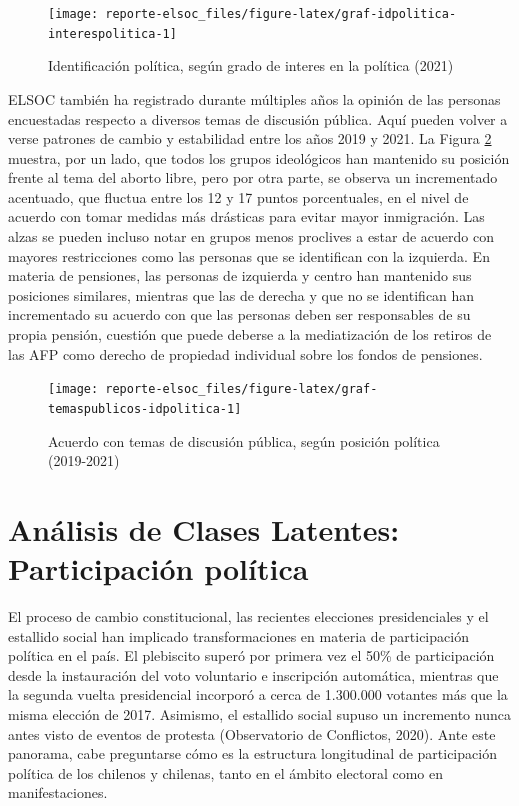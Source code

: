 \documentclass[
  12pt,
]{book}
\begin{document}
\begin{figure}

{\centering \texttt{[image: reporte-elsoc\_files/figure-latex/graf-idpolitica-interespolitica-1]} 

}

\caption{Identificación política, según grado de interes en la política (2021)}\label{fig:graf-idpolitica-interespolitica}
\end{figure}

ELSOC también ha registrado durante múltiples años la opinión de las personas encuestadas respecto a diversos temas de discusión pública. Aquí pueden volver a verse patrones de cambio y estabilidad entre los años 2019 y 2021. La Figura \ref{fig:graf-temaspublicos-idpolitica} muestra, por un lado, que todos los grupos ideológicos han mantenido su posición frente al tema del aborto libre, pero por otra parte, se observa un incrementado acentuado, que fluctua entre los 12 y 17 puntos porcentuales, en el nivel de acuerdo con tomar medidas más drásticas para evitar mayor inmigración. Las alzas se pueden incluso notar en grupos menos proclives a estar de acuerdo con mayores restricciones como las personas que se identifican con la izquierda. En materia de pensiones, las personas de izquierda y centro han mantenido sus posiciones similares, mientras que las de derecha y que no se identifican han incrementado su acuerdo con que las personas deben ser responsables de su propia pensión, cuestión que puede deberse a la mediatización de los retiros de las AFP como derecho de propiedad individual sobre los fondos de pensiones.

\begin{figure}

{\centering \texttt{[image: reporte-elsoc\_files/figure-latex/graf-temaspublicos-idpolitica-1]} 

}

\caption{Acuerdo con temas de discusión pública, según posición política (2019-2021)}\label{fig:graf-temaspublicos-idpolitica}
\end{figure}

\hypertarget{anuxe1lisis-de-clases-latentes-participaciuxf3n-poluxedtica}{%
\section{Análisis de Clases Latentes: Participación política}\label{anuxe1lisis-de-clases-latentes-participaciuxf3n-poluxedtica}}

El proceso de cambio constitucional, las recientes elecciones presidenciales y el estallido social han implicado transformaciones en materia de participación política en el país. El plebiscito superó por primera vez el 50\% de participación desde la instauración del voto voluntario e inscripción automática, mientras que la segunda vuelta presidencial incorporó a cerca de 1.300.000 votantes más que la misma elección de 2017. Asimismo, el estallido social supuso un incremento nunca antes visto de eventos de protesta (Observatorio de Conflictos, 2020). Ante este panorama, cabe preguntarse cómo es la estructura longitudinal de participación política de los chilenos y chilenas, tanto en el ámbito electoral como en manifestaciones.
\end{document}
